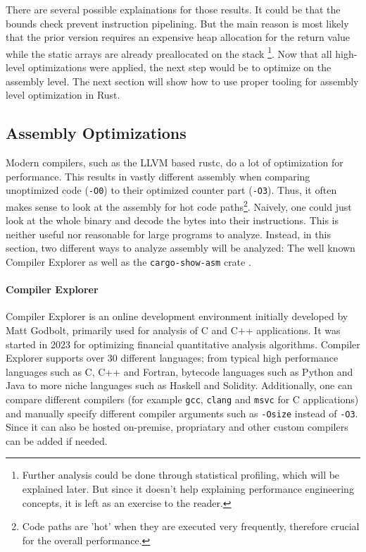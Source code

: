 There are several possible explainations for those results. It could be that the bounds check prevent instruction pipelining. But the main reason is most likely that the prior version requires an expensive heap allocation for the return value while the static arrays are already preallocated on the stack \footnote{Further analysis could be done through statistical profiling, which will be explained later. But since it doesn't help explaining performance engineering concepts, it is left as an exercise to the reader.}. Now that all high-level optimizations were applied, the next step would be to optimize on the assembly level. The next section will show how to use proper tooling for assembly level optimization in Rust.

\subsection{Assembly Optimizations}
Modern compilers, such as the \ac{LLVM} based rustc, do a lot of optimization for performance. This results in vastly different assembly when comparing unoptimized code (\texttt{-O0}) to their optimized counter part (\texttt{-O3}). Thus, it often makes sense to look at the assembly for hot code paths\footnote{Code paths are 'hot' when they are executed very frequently, therefore crucial for the overall performance.}. Naively, one could just look at the whole binary and decode the bytes into their instructions. This is neither useful nor reasonable for large programs to analyze. Instead, in this section, two different ways to analyze assembly will be analyzed: The well known Compiler Explorer \cite{compilerexplorer} as well as the \texttt{cargo-show-asm} crate \cite{cargoshowasm}.

\paragraph{Compiler Explorer}

Compiler Explorer \cite{compilerexplorer} is an online development environment initially developed by Matt Godbolt, primarily used for analysis of C and C++ applications. It was started in 2023 for optimizing financial quantitative analysis algorithms. Compiler Explorer supports over 30 different languages; from typical high performance languages such as C, C++ and Fortran, bytecode languages such as Python and Java to more niche languages such as Haskell and Solidity. Additionally, one can compare different compilers (for example \texttt{gcc}, \texttt{clang} and \texttt{msvc} for C applications) and manually specify different compiler arguments such as \texttt{-Osize} instead of \texttt{-O3}. Since it can also be hosted on-premise, propriatary and other custom compilers can be added if needed.

